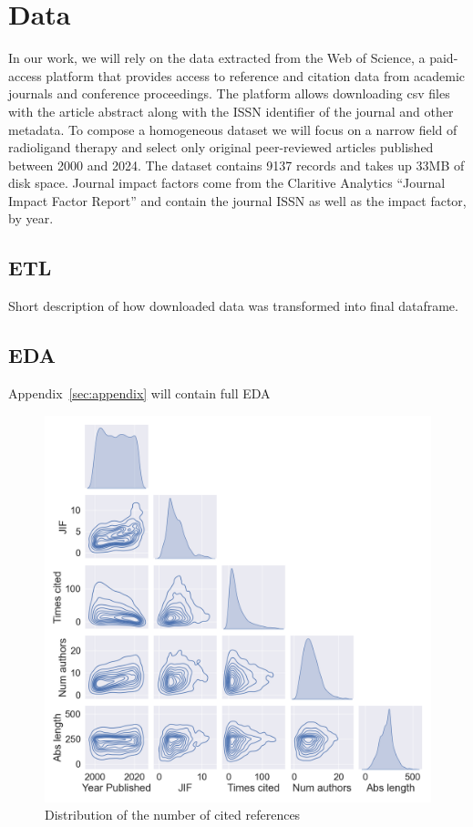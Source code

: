 \documentclass[11pt]{article}
\begin{document}
\section{Data}
In our work, we will rely on the data extracted from the Web of Science, a paid-access platform that provides access to reference and citation data from academic journals and conference proceedings. The platform allows downloading csv files with the article abstract along with the ISSN identifier of the journal and other metadata. To compose a homogeneous dataset we will focus on a narrow field of radioligand therapy and select only original peer-reviewed articles published between 2000 and 2024. The dataset contains 9137 records and takes up 33MB of disk space. Journal impact factors come from the Claritive Analytics “Journal Impact Factor Report” and contain the journal ISSN as well as the impact factor, by year.
\subsection{ETL}
Short description of how downloaded data was transformed into final dataframe. 
\subsection{EDA}
Appendix~\ref{sec:appendix} will contain full EDA

\begin{figure}
	\includegraphics[width= \columnwidth]{./Images/Pairplot.png}
	\caption{Distribution of the number of cited references}
	\label{fig:img1}
\end{figure}
\end{document}
